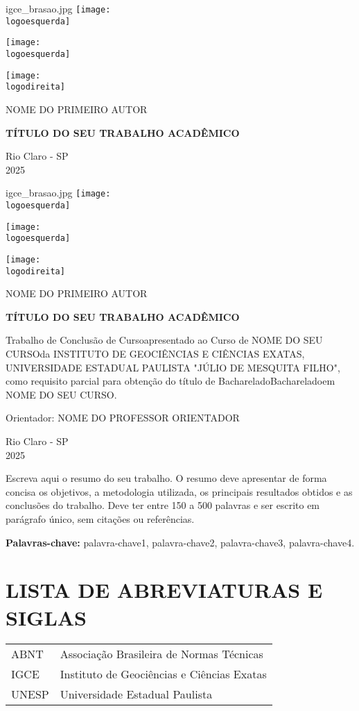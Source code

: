 \documentclass[12pt, a4paper, brazil, oneside]{abntex2}
\newcommand{\logoesquerda}{unesp_logo.jpg}        %
\newcommand{\logodireita}{igce_brasao.jpg}        %
\renewcommand{\instituicao}{UNIVERSIDADE ESTADUAL PAULISTA "JÚLIO DE MESQUITA FILHO"}
\newcommand{\faculdade}{INSTITUTO DE GEOCIÊNCIAS E CIÊNCIAS EXATAS}
\newcommand{\cidade}{Rio Claro - SP}
\renewcommand{\imprimircapa}{
    \newpage                    %
    \thispagestyle{empty}       %
    \begin{center}              %
        \vspace*{-2cm}          %
        
        \ifx\logodireita\empty
            \texttt{[image: \\logoesquerda]}
        \else
            \begin{minipage}[c]{0.45\textwidth}
                \centering
                \texttt{[image: \\logoesquerda]} 
            \end{minipage}
            \hspace{0.05\textwidth}  %
            \begin{minipage}[c]{0.45\textwidth}
                \centering
                \texttt{[image: \\logodireita]}
            \end{minipage}
        \fi
        
        \vspace{4cm}            %
        
        {\large NOME DO PRIMEIRO AUTOR}
        \vspace{0.2cm}\par      %
        
        \vfill                  %
        
        {\large \bfseries TÍTULO DO SEU TRABALHO ACADÊMICO\par}
        
        \vfill                  %
        \vfill                  %
        
        {\large \cidade}\\
        {\large 2025}          %
    \end{center}
    \newpage                   %
}
\renewcommand{\tipotrabalho}{Trabalho de Conclusão de Curso}
\newcommand{\grautrabalho}{Bacharelado}
\newcommand{\cursotrabalho}{NOME DO SEU CURSO}
\newcommand{\orientacao}{Orientador: NOME DO PROFESSOR ORIENTADOR}
\renewcommand{\imprimirfolhaderosto}{
    \newpage                    %
    \thispagestyle{empty}       %
    \begin{center}              %
        \vspace*{-2cm}          %
        
        \ifx\logodireita\empty
            \texttt{[image: \\logoesquerda]}
        \else
            \begin{minipage}[c]{0.45\textwidth}
                \centering
                \texttt{[image: \\logoesquerda]} 
            \end{minipage}
            \hspace{0.05\textwidth}  %
            \begin{minipage}[c]{0.45\textwidth}
                \centering
                \texttt{[image: \\logodireita]}
            \end{minipage}
        \fi
        
        \vspace{2cm}            %
        
        {\large NOME DO PRIMEIRO AUTOR}
        \vspace{0.2cm}\par
        
        \vspace{1.5cm}          %
        
        {\large \bfseries TÍTULO DO SEU TRABALHO ACADÊMICO\par}
        
        \vspace{1.5cm}          %
        
        \begin{flushright}      %
            \begin{minipage}{0.5\textwidth}  %
                \linespread{1.3}\selectfont   %
                \tipotrabalho\space apresentado ao Curso de \cursotrabalho\space da \faculdade, \instituicao, como requisito parcial para obtenção do título de \ifx\grautrabalho\empty\else\grautrabalho\space em \cursotrabalho\fi.
                \vspace{1cm}\par  %
                \orientacao
            \end{minipage}
        \end{flushright}

        \vfill                  %
        
        {\large \cidade}\\
        {\large 2025}          %
    \end{center}
    \newpage                   %
}
\begin{document}
\OnehalfSpacing


\imprimircapa

\imprimirfolhaderosto


\begin{resumo}

Escreva aqui o resumo do seu trabalho. O resumo deve apresentar de forma concisa os objetivos, a metodologia utilizada, os principais resultados obtidos e as conclusões do trabalho. Deve ter entre 150 a 500 palavras e ser escrito em parágrafo único, sem citações ou referências.

\vspace{\onelineskip}    %
\noindent               %
\textbf{Palavras-chave:} palavra-chave1, palavra-chave2, palavra-chave3, palavra-chave4.

\end{resumo}


\newpage

\newpage


\newpage
\chapter*{LISTA DE ABREVIATURAS E SIGLAS}
\begin{tabular}{ll}
ABNT    & Associação Brasileira de Normas Técnicas\\
IGCE    & Instituto de Geociências e Ciências Exatas\\
UNESP   & Universidade Estadual Paulista\\
\end{tabular}
\end{document}
